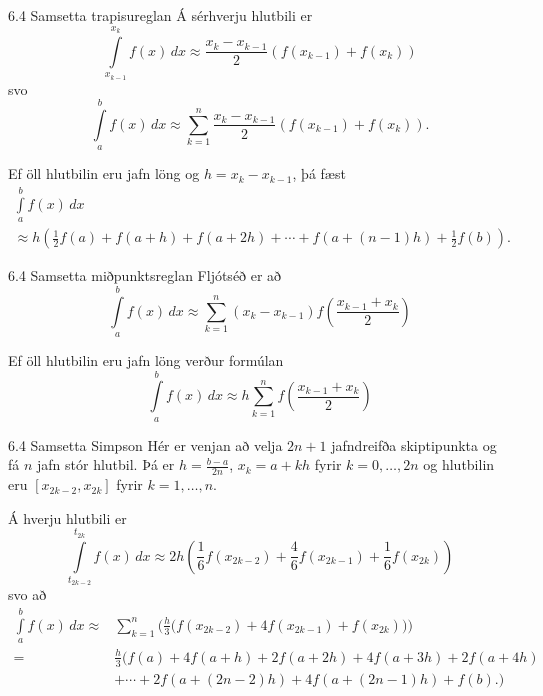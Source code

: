 \begin{frame}{6.4 Samsetta trapisureglan} 
Á sérhverju hlutbili er
\begin{equation*}
  \int\limits_{x_{k-1}}^{x_k} f(x) \, dx
  \approx
  \frac{x_k-x_{k-1}}{2}(f(x_{k-1}) + f(x_k))
\end{equation*}
svo
\begin{equation*}
  \int\limits_a^b f(x) \, dx
  \approx
  \sum\limits_{k=1}^n \frac{x_k-x_{k-1}}{2}(f(x_{k-1}) + f(x_k)).
\end{equation*}

\pause
\smallskip
Ef öll hlutbilin eru jafn löng og $h = x_k-x_{k-1}$, \pause
þá fæst
\begin{multline*}
  \int\limits_a^b f(x) \, dx \\
  \approx 
  h\left( \frac{1}{2}f(a) + f(a+h) + f(a+2h) 
    + \cdots + f(a+(n-1)h) + \frac{1}{2}f(b) \right).
\end{multline*}\end{frame}


\begin{frame}{6.4 Samsetta miðpunktsreglan} 
Fljótséð er að
\begin{equation*}
  \int\limits_a^b f(x) \, dx
  \approx
  \sum\limits_{k=1}^n (x_k-x_{k-1})f
  \left(
    \frac{x_{k-1}+x_k}{2}
  \right)
\end{equation*}

\pause
\smallskip
Ef öll hlutbilin eru jafn löng verður formúlan
\begin{equation*}
  \int\limits_a^b f(x) \, dx
  \approx
  h \sum\limits_{k=1}^n f \left(\frac{x_{k-1}+x_k}{2}\right)
\end{equation*}
\end{frame}


\begin{frame}{6.4 Samsetta Simpson}
Hér er venjan að velja $2n+1$ jafndreifða skiptipunkta og fá $n$ jafn
stór hlutbil. Þá er $h = \frac{b-a}{2n}$, $x_k = a + kh$ fyrir $k =
0,\ldots,2n$ og hlutbilin eru $[x_{2k-2},x_{2k}]$ fyrir $k = 1,
\ldots, n$. 

\pause
\smallskip
Á hverju hlutbili er 
\begin{equation*}
  \int\limits_{t_{2k-2}}^{t_{2k}} f(x) \, dx
  \approx
  2h \left(
    \frac{1}{6} f(x_{2k-2}) + \frac{4}{6} f(x_{2k-1}) 
    + \frac{1}{6} f(x_{2k})
  \right)
\end{equation*}
\pause
svo að
{\small 
\begin{align*}
  \int\limits_a^b f(x) \, dx
  \approx &
  \sum\limits_{k=1}^n
  \bigg(
    \frac{h}{3}
    \Big(
      f(x_{2k-2}) + 4f(x_{2k-1}) + f(x_{2k})
    \Big)
  \bigg) \\
  = &
  \frac{h}{3}
  \Big( 
    f(a) + 4f(a+h) + 2f(a+2h)+ 4f(a+3h) + 2f(a+4h) \\
    &+ \cdots + 2f(a+(2n-2)h) + 4f(a+(2n-1)h) + f(b).
  \Big)
\end{align*}}
\end{frame}


